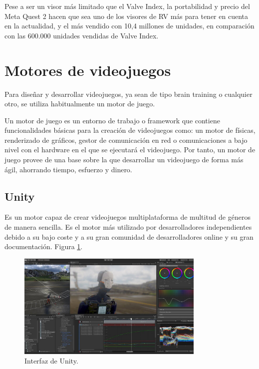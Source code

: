 Pese a ser un visor más limitado que el Valve Index, la portabilidad y precio del Meta Quest 2 hacen que sea uno de los visores de RV más para tener en cuenta en la actualidad, y el más vendido con 10,4 millones de unidades, en comparación con las 600.000 unidades vendidas de Valve Index. \cite{EA_vr_ventas}





\section{Motores de videojuegos}

Para diseñar y desarrollar videojuegos, ya sean de tipo brain training o cualquier otro, se utiliza habitualmente un motor de juego.

Un motor de juego es un entorno de trabajo o framework que contiene funcionalidades básicas para la creación de videojuegos como: un motor de físicas, renderizado de gráficos, gestor de comunicación en red o comunicaciones a bajo nivel con el hardware en el que se ejecutará el videojuego. Por tanto, un motor de juego provee de una base sobre la que desarrollar un videojuego de forma más ágil, ahorrando tiempo, esfuerzo y dinero. \cite{EA_engine_definicion}

\subsection{Unity}

Es un motor capaz de crear videojuegos multiplataforma de multitud de géneros de manera sencilla. Es el motor más utilizado por desarrolladores independientes debido a su bajo coste y a su gran comunidad de desarrolladores online y su gran documentación. \cite{EA_engine_unity} Figura \ref{fig:EA_interfazUnity}.


\begin{figure}[H]
  \centering
\includegraphics[width=0.8\textwidth]{03.EstudioProblema/01.EstadoArte/00.Figuras/26.interfaz_unity.jpg}
    \caption{Interfaz de Unity. \cite{EA_img_interfazUnity}}
    \label{fig:EA_interfazUnity}
\end{figure}


